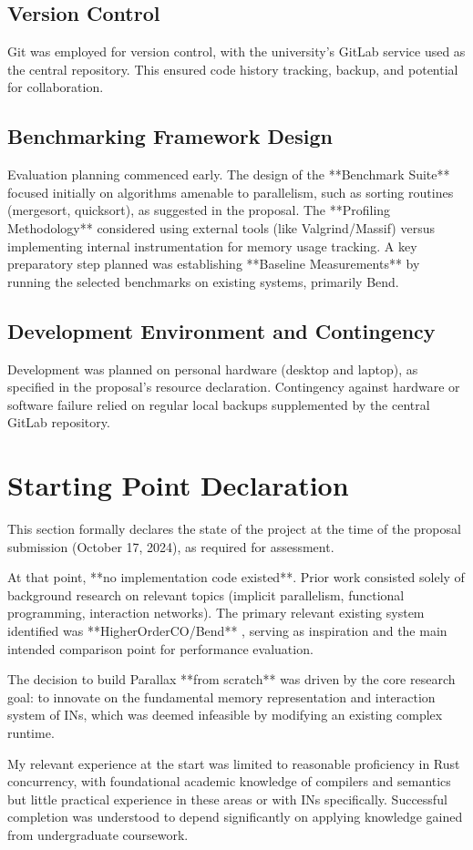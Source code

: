 \subsection{Version Control} %
Git was employed for version control, with the university's GitLab service used as the central repository. This ensured code history tracking, backup, and potential for collaboration.

\subsection{Benchmarking Framework Design} %
Evaluation planning commenced early. The design of the **Benchmark Suite** focused initially on algorithms amenable to parallelism, such as sorting routines (mergesort, quicksort), as suggested in the proposal. The **Profiling Methodology** considered using external tools (like Valgrind/Massif) versus implementing internal instrumentation for memory usage tracking. A key preparatory step planned was establishing **Baseline Measurements** by running the selected benchmarks on existing systems, primarily Bend.

\subsection{Development Environment and Contingency} %
Development was planned on personal hardware (desktop and laptop), as specified in the proposal's resource declaration. Contingency against hardware or software failure relied on regular local backups supplemented by the central GitLab repository.

\section{Starting Point Declaration} %

This section formally declares the state of the project at the time of the proposal submission (October 17, 2024), as required for assessment.

At that point, **no implementation code existed**. Prior work consisted solely of background research on relevant topics (implicit parallelism, functional programming, interaction networks). The primary relevant existing system identified was **HigherOrderCO/Bend** \cite{BendGithub}, serving as inspiration and the main intended comparison point for performance evaluation.

The decision to build Parallax **from scratch** was driven by the core research goal: to innovate on the fundamental memory representation and interaction system of INs, which was deemed infeasible by modifying an existing complex runtime.

My relevant experience at the start was limited to reasonable proficiency in Rust concurrency, with foundational academic knowledge of compilers and semantics but little practical experience in these areas or with INs specifically. Successful completion was understood to depend significantly on applying knowledge gained from undergraduate coursework.


